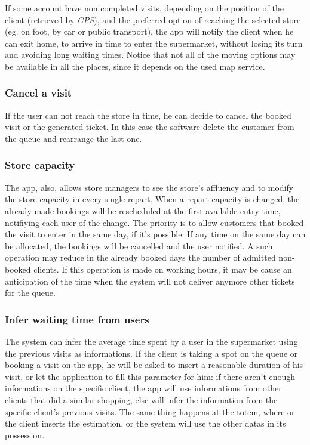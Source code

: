 \documentclass{article}
\begin{document}
		If some account have non completed visits, depending on the position of the client (retrieved by \emph{GPS}), and the preferred option of reaching the selected store (eg. on foot, by car or public transport), the app will notify the client when he can exit home, to arrive in time to enter the supermarket, without losing its turn and avoiding long waiting times. Notice that not all of the moving options may be available in all the places, since it depends on the used map service. \\
		
		\subsubsection{Cancel a visit}
		
		If the user can not reach the store in time, he can decide to cancel the booked visit or the generated ticket. In this case the software delete the customer from the queue and rearrange the last one. \\
		
		\subsubsection{Store capacity}
		
		The app, also, allows store managers to see the store's affluency and to modify the store capacity in every single repart. When a repart capacity is changed, the already made bookings will be rescheduled at the first available entry time, notifiying each user of the change. The priority is to allow customers that booked the visit to enter in the same day, if it's possible. If any time on the same day can be allocated, the bookings will be cancelled and the user notified. A such operation may reduce in the already booked days the number of admitted non-booked clients. If this operation is made on working hours, it may be cause an anticipation of the time when the system will not deliver anymore other tickets for the queue. \\
		
		\subsubsection{Infer waiting time from users}
		
		The system can infer the average time spent by a user in the supermarket using the previous visits as informations. If the client is taking a spot on the queue or booking a visit on the app, he will be asked to insert a reasonable duration of his visit, or let the application to fill this parameter for him: if there aren't enough informations on the specific client, the app will use informations from other clients that did a similar shopping, else will infer the information from the specific client's previous visits. The same thing happens at the totem, where or the client inserts the estimation, or the system will use the other datas in its possession.  \\
		
\end{document}
